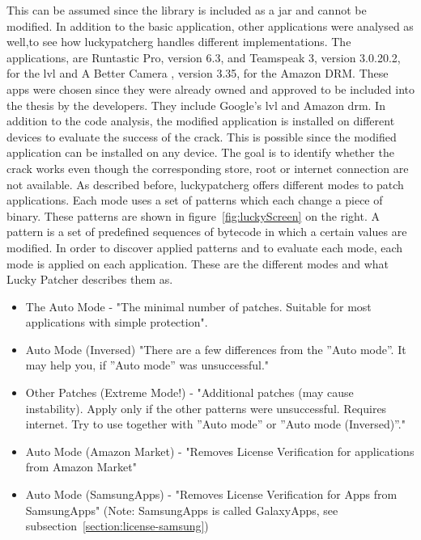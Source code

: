This can be assumed since the library is included as a \gls{jar} and cannot be modified.
In addition to the basic application, other applications were analysed as well,to see how \gls{luckypatcherg} handles different implementations.
The applications, are Runtastic Pro\cite{runtasticApp}, version 6.3, and Teamspeak 3\cite{teamspeakApp}, version 3.0.20.2, for the \gls{lvl} and A Better Camera \cite{abettercamera}, version 3.35, for the Amazon DRM.
These apps were chosen since they were already owned and approved to be included into the thesis by the developers.
They include Google’s \gls{lvl} and Amazon \gls{drm}.
\newline
In addition to the code analysis, the modified application is installed on different devices to evaluate the success of the crack.
This is possible since the modified application can be installed on any device.
The goal is to identify whether the crack works even though the corresponding store, root or internet connection are not available.
\newline
As described before, \gls{luckypatcherg} offers different modes to patch applications.
Each mode uses a set of patterns which each change a piece of binary.
These patterns are shown in figure~\ref{fig:luckyScreen} on the right.
A pattern is a set of predefined sequences of bytecode in which a certain values are modified.
In order to discover applied patterns and to evaluate each mode, each mode is applied on each application.
\newline
These are the different modes and what Lucky Patcher describes them as.
\begin{itemize}
\item The Auto Mode - "The minimal number of patches. Suitable for most applications with simple protection".
\item Auto Mode (Inversed) "There are a few differences from the ”Auto mode”. It may help you, if ”Auto mode” was unsuccessful."
\item Other Patches (Extreme Mode!) - "Additional patches (may cause instability). Apply only if the other patterns were unsuccessful. Requires internet. Try to use together with ”Auto mode” or ”Auto mode (Inversed)”."
\item Auto Mode (Amazon Market) - "Removes License Verification for applications from Amazon Market"
\item Auto Mode (SamsungApps) - "Removes License Verification for Apps from SamsungApps" (Note: SamsungApps is called GalaxyApps, see subsection~\ref{section:license-samsung})
\end{itemize}
